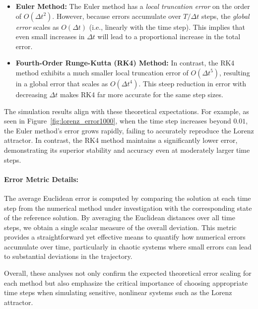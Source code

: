 \begin{itemize}
    \item \textbf{Euler Method:} The Euler method has a \emph{local truncation error} on the order of \(O(\Delta t^2)\). However, because errors accumulate over \(T/\Delta t\) steps, the \emph{global error} scales as \(O(\Delta t)\) (i.e., linearly with the time step). This implies that even small increases in \(\Delta t\) will lead to a proportional increase in the total error.
    \item \textbf{Fourth-Order Runge-Kutta (RK4) Method:} In contrast, the RK4 method exhibits a much smaller local truncation error of \(O(\Delta t^5)\), resulting in a global error that scales as \(O(\Delta t^4)\). This steep reduction in error with decreasing \(\Delta t\) makes RK4 far more accurate for the same step sizes.
\end{itemize}

The simulation results align with these theoretical expectations. For example, as seen in Figure~\ref{fig:lorenz_error1000}, when the time step increases beyond \(0.01\), the Euler method's error grows rapidly, failing to accurately reproduce the Lorenz attractor. In contrast, the RK4 method maintains a significantly lower error, demonstrating its superior stability and accuracy even at moderately larger time steps.

\paragraph{Error Metric Details:}
The average Euclidean error is computed by comparing the solution at each time step from the numerical method under investigation with the corresponding state of the reference solution. By averaging the Euclidean distances over all time steps, we obtain a single scalar measure of the overall deviation. This metric provides a straightforward yet effective means to quantify how numerical errors accumulate over time, particularly in chaotic systems where small errors can lead to substantial deviations in the trajectory.

Overall, these analyses not only confirm the expected theoretical error scaling for each method but also emphasize the critical importance of choosing appropriate time steps when simulating sensitive, nonlinear systems such as the Lorenz attractor.

% 
